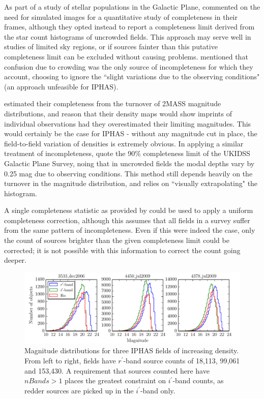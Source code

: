 \documentclass[a4paper,useAMS,usenatbib]{mn2e}
\begin{document}
As part of a study of stellar populations in the Galactic Plane,
\citet{Ruphy1997} commented on the need for simulated images for a quantitative
study of completeness in their frames, although they opted instead to report a
completeness limit derived from the star count histograms of uncrowded fields.
This approach may serve well in studies of limited sky regions, or if sources
fainter than this putative completeness limit can be excluded without causing
problems. \citet{Ruphy1997} mentioned that confusion due to crowding was the
only source of incompleteness for which they account, choosing to ignore the
``slight variations due to the observing conditions" (an approach unfeasible for
IPHAS).

\citet{Cambresy2002} estimated their completeness from the turnover of 2MASS
magnitude distributions, and reason that their density maps would show imprints
of individual observations had they overestimated their limiting magnitudes.
This would certainly be the case for IPHAS - without any magnitude cut in
place, the field-to-field variation of densities is extremely obvious.  In applying a 
similar treatment of incompleteness, \citet{Lucas2008} quote the 90\% completeness 
limit of the UKIDSS Galactic Plane Survey, noing that in uncrowded fields the modal
depths vary by 0.25 mag due to observing conditions. This method still depends
heavily on the turnover in the magnitude distribution, and relies on 
``visually extrapolating" the histogram.

A single completeness statistic as provided by \citet{Lucas2008} could be used
to apply a uniform completeness correction, although this assumes that all
fields in a survey suffer from the same pattern of incompleteness. Even if this
were indeed the case, only the count of sources brighter than the given
completeness limit could be corrected; it is not possible with this information
to correct the count going deeper.

\begin{figure}
\begin{center}
\includegraphics[width=1\textwidth]{figures/magnitude_turnovers.pdf} 
\caption{\footnotesize Magnitude distributions for three IPHAS fields of 
increasing density. From left to right, fields have $r^{\prime}$-band source 
counts of 18,113, 99,061 and 153,430. A requirement that sources counted here 
have $nBands>1$ places the greatest constraint on $i^{\prime}$-band counts, 
as redder sources are picked up in the $i^{\prime}$-band only.}
\label{fig:magnitude_turnovers}
\end{center}
\end{figure}
\end{document}
